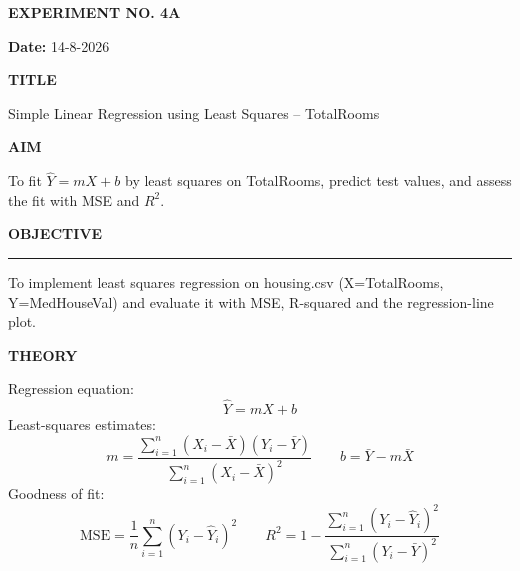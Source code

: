 \documentclass[11pt,twoside]{article}
\newcommand{\expheading}[1]{{\fontsize{14}{17}\selectfont\textbf{#1}\par}}
\newcommand{\fullrule}{\noindent\rule{\textwidth}{0.6pt}\par}
\begin{document}
{\setlength{\parskip}{1pt}\setlength{\abovedisplayskip}{2pt}\setlength{\belowdisplayskip}{2pt}
\begin{center}
\expheading{EXPERIMENT NO. 4A}
\end{center}
\vspace{2pt}

\noindent\textbf{Date:} 14-8-2026\par
\vspace{6pt}

\expheading{TITLE}
\vspace{4pt}
\noindent Simple Linear Regression using Least Squares -- TotalRooms\par
\vspace{4pt}

\expheading{AIM}
\vspace{4pt}
\noindent To fit $\hat{Y}=mX+b$ by least squares on TotalRooms, predict test values, and assess the fit with MSE and $R^2$. \par
\vspace{4pt}

\expheading{OBJECTIVE}
\vspace{2pt}
\fullrule
\vspace{4pt}
\noindent To implement least squares regression on housing.csv (X=TotalRooms, Y=MedHouseVal) and evaluate it with MSE, R-squared and the regression-line plot. \par
\vspace{4pt}

\expheading{THEORY}
\vspace{4pt}
Regression equation:
\[\hat{Y}=mX+b\]
Least-squares estimates:
\[m=\frac{\sum_{i=1}^{n}(X_i-\bar{X})(Y_i-\bar{Y})}{\sum_{i=1}^{n}(X_i-\bar{X})^2}\qquad b=\bar{Y}-m\bar{X}\]
Goodness of fit:
\[\mathrm{MSE}=\frac{1}{n}\sum_{i=1}^{n}(Y_i-\hat{Y}_i)^2\qquad R^2=1-\frac{\sum_{i=1}^{n}(Y_i-\hat{Y}_i)^2}{\sum_{i=1}^{n}(Y_i-\bar{Y})^2}\]
\vspace{4pt}

}
\end{document}
